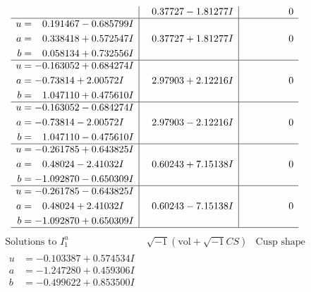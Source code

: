 \documentclass[1p]{elsarticle_modified}
\theoremstyle{definition}
\newcommand{\I}{\sqrt{-1}}
\begin{document}
$$\begin{array}{c|c|c}
 & \phantom{-}0.37727 - 1.81277 I & \phantom{-0.000000 } 0 \\ \hline\begin{aligned}
u &= \phantom{-}0.191467 - 0.685799 I \\
a &= \phantom{-}0.338418 + 0.572547 I \\
b &= \phantom{-}0.058134 + 0.732556 I\end{aligned}
 & \phantom{-}0.37727 + 1.81277 I & \phantom{-0.000000 } 0 \\ \hline\begin{aligned}
u &= -0.163052 + 0.684274 I \\
a &= -0.73814 + 2.00572 I \\
b &= \phantom{-}1.047110 + 0.475610 I\end{aligned}
 & \phantom{-}2.97903 + 2.12216 I & \phantom{-0.000000 } 0 \\ \hline\begin{aligned}
u &= -0.163052 - 0.684274 I \\
a &= -0.73814 - 2.00572 I \\
b &= \phantom{-}1.047110 - 0.475610 I\end{aligned}
 & \phantom{-}2.97903 - 2.12216 I & \phantom{-0.000000 } 0 \\ \hline\begin{aligned}
u &= -0.261785 + 0.643825 I \\
a &= \phantom{-}0.48024 - 2.41032 I \\
b &= -1.092870 - 0.650309 I\end{aligned}
 & \phantom{-}0.60243 + 7.15138 I & \phantom{-0.000000 } 0 \\ \hline\begin{aligned}
u &= -0.261785 - 0.643825 I \\
a &= \phantom{-}0.48024 + 2.41032 I \\
b &= -1.092870 + 0.650309 I\end{aligned}
 & \phantom{-}0.60243 - 7.15138 I & \phantom{-0.000000 } 0\\
 \hline 
 \end{array}$$\newpage$$\begin{array}{c|c|c}  
\text{Solutions to }I^u_{1}& \I (\text{vol} + \sqrt{-1}CS) & \text{Cusp shape}\\
 \hline 
\begin{aligned}
u &= -0.103387 + 0.574534 I \\
a &= -1.247280 + 0.459306 I \\
b &= -0.499622 + 0.853500 I\end{aligned}

\end{array}$$
\end{document}
